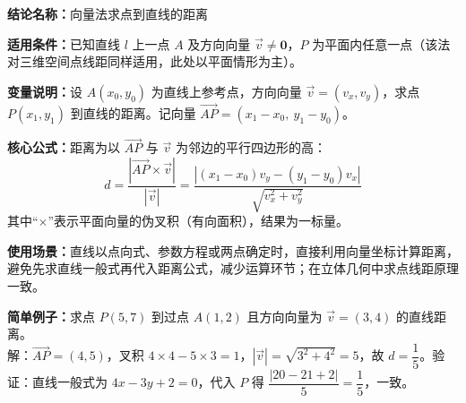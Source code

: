 \textbf{结论名称：}向量法求点到直线的距离

\textbf{适用条件：}已知直线 \(l\) 上一点 \(A\) 及方向向量 \(\vec{v}\neq\mathbf{0}\)，\(P\) 为平面内任意一点（该法对三维空间点线距同样适用，此处以平面情形为主）。

\textbf{变量说明：}设 \(A(x_0,y_0)\) 为直线上参考点，方向向量 \(\vec{v}=(v_x,v_y)\)，求点 \(P(x_1,y_1)\) 到直线的距离。记向量 \(\vec{AP}=(x_1-x_0,\ y_1-y_0)\)。

\textbf{核心公式：}距离为以 \(\vec{AP}\) 与 \(\vec{v}\) 为邻边的平行四边形的高：
\[
\boxed{d = \frac{|\vec{AP} \times \vec{v}|}{|\vec{v}|} = \frac{|(x_1-x_0)v_y - (y_1-y_0)v_x|}{\sqrt{v_x^2+v_y^2}}}
\]
其中“\(\times\)”表示平面向量的伪叉积（有向面积），结果为一标量。

\textbf{使用场景：}直线以点向式、参数方程或两点确定时，直接利用向量坐标计算距离，避免先求直线一般式再代入距离公式，减少运算环节；在立体几何中求点线距原理一致。

\textbf{简单例子：}求点 \(P(5,7)\) 到过点 \(A(1,2)\) 且方向向量为 \(\vec{v}=(3,4)\) 的直线距离。\\
解：\(\vec{AP}=(4,5)\)，叉积 \(4\times4-5\times3=1\)，\(|\vec{v}|=\sqrt{3^2+4^2}=5\)，故 \(d=\dfrac{1}{5}\)。验证：直线一般式为 \(4x-3y+2=0\)，代入 \(P\) 得 \(\dfrac{|20-21+2|}{5}=\dfrac{1}{5}\)，一致。